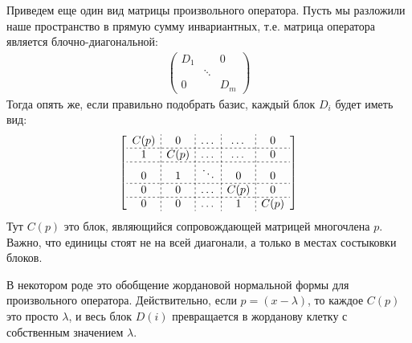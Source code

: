 Приведем еще один вид матрицы произвольного оператора.
Пусть мы разложили наше пространство в прямую сумму инвариантных, т.е. матрица оператора является блочно-диагональной: \begin{gather*}
    \begin{pmatrix}
        D_1 &  & 0 \\ 
        & \ddots &  \\ 
        0 &  & D_m
    \end{pmatrix}
\end{gather*}
Тогда опять же, если правильно подобрать базис, каждый блок $D_i$ будет иметь вид: 
$$
\left[
    \begin{array}{c;{2pt/2pt}c;{2pt/2pt}c;{2pt/2pt}c;{2pt/2pt}cc}
        C(p) & 0 & \dots & \dots & 0 \\ \hdashline[2pt/2pt]
        1 & C(p) & \dots & \dots & 0 \\ \hdashline[2pt/2pt]
        0 & 1 & \ddots & 0 & 0 \\ \hdashline[2pt/2pt]
        0 & 0 & \dots & C(p) & 0 \\ \hdashline[2pt/2pt]
        0 & 0 & \dots & 1 & C(p)
    \end{array}
\right]
$$
Тут $C(p)$ это блок, являющийся сопровождающей матрицей многочлена $p$.
Важно, что единицы стоят не на всей диагонали, а только в местах состыковки блоков.

В некотором роде это обобщение жордановой нормальной формы для произвольного оператора.
Действительно, если $p = (x - \lambda)$, то каждое $C(p)$ это просто $\lambda$, и весь блок $D(i)$ превращается в жорданову клетку с собственным значением $\lambda$.
